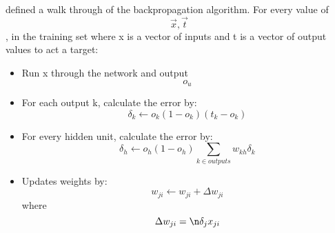 \parencite{MLANN} defined a walk through of the backpropagation algorithm.
For every value of \[\vec{x}, \vec{t}\], in the training set where x is a vector of inputs and t is a vector of output values to act a target:
\begin{itemize}
	\item{Run x through the network and output \[o_{u}\]}
	\item{For each output k, calculate the error by: \[\delta_{k} \leftarrow o_{k}(1 - o_{k})(t_{k} - o_{k}) \]}
	\item{For every hidden unit, calculate the error by: \[\delta_{h} \leftarrow o_{h}(1 - o_{h}) \sum_{k \in outputs}   w_{kh}\delta_{k}\]}
	\item{Updates weights by: \[w_{ji} \leftarrow w_{ji} + \Delta w_{ji}\] where \[\Delta w_{ji} = \n \delta_{j} x_{ji}\]}
\end{itemize}
